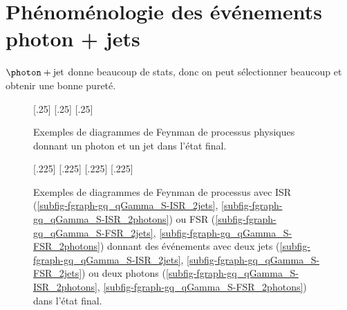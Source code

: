 \section{Phénoménologie des événements photon + jets}\label{chapter-JERC-section-pheno-GJets}
$\photon+\text{jet}$ donne beaucoup de stats, donc on peut sélectionner beaucoup et obtenir une bonne pureté.
\begin{figure}[h]
\centering\vspace{\baselineskip}
\subcaptionbox{\label{subfig-fgraph-gq_qGamma_S}}[.25\textwidth]
{}
\qquad
\subcaptionbox{\label{subfig-fgraph-gq_qGamma_T}}[.25\textwidth]
{}
\qquad
\subcaptionbox{\label{subfig-fgraph-qq_gGamma}}[.25\textwidth]
{}
\caption{Exemples de diagrammes de Feynman de processus physiques donnant un photon et un jet dans l'état final.}
\label{fig-fgraph-gamma_plus_jets}
\end{figure}

\begin{figure}[h]
\centering\vspace{\baselineskip}
\subcaptionbox{\label{subfig-fgraph-gq_qGamma_S-ISR_2jets}}[.225\textwidth]
{}
\hfill
\subcaptionbox{\label{subfig-fgraph-gq_qGamma_S-ISR_2photons}}[.225\textwidth]
{}
\hfill
\subcaptionbox{\label{subfig-fgraph-gq_qGamma_S-FSR_2jets}}[.225\textwidth]
{}
\hfill
\subcaptionbox{\label{subfig-fgraph-gq_qGamma_S-FSR_2photons}}[.225\textwidth]
{}
\caption{Exemples de diagrammes de Feynman de processus avec ISR (\ref{subfig-fgraph-gq_qGamma_S-ISR_2jets}, \ref{subfig-fgraph-gq_qGamma_S-ISR_2photons}) ou FSR (\ref{subfig-fgraph-gq_qGamma_S-FSR_2jets}, \ref{subfig-fgraph-gq_qGamma_S-FSR_2photons}) donnant des événements avec deux jets (\ref{subfig-fgraph-gq_qGamma_S-ISR_2jets}, \ref{subfig-fgraph-gq_qGamma_S-FSR_2jets}) ou deux photons (\ref{subfig-fgraph-gq_qGamma_S-ISR_2photons}, \ref{subfig-fgraph-gq_qGamma_S-FSR_2photons}) dans l'état final.}
\label{fig-fgraph-gamma_plus_jets-ISR-FSR}
\end{figure}

